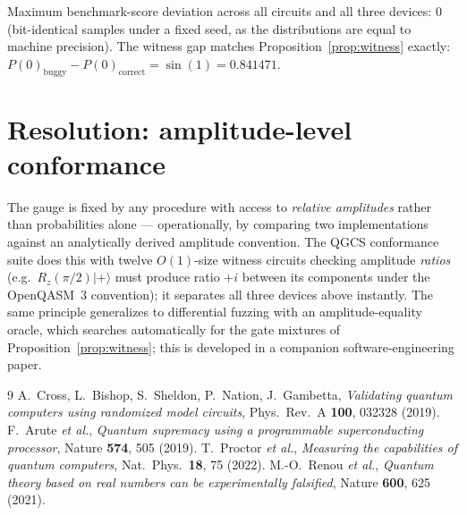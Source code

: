 \documentclass[11pt]{article}
\theoremstyle{definition}
\theoremstyle{remark}
\newcommand{\ket}[1]{\lvert #1 \rangle}
\begin{document}
Maximum benchmark-score deviation across all circuits and all three
devices: $0$ (bit-identical samples under a fixed seed, as the
distributions are equal to machine precision). The witness gap matches
Proposition~\ref{prop:witness} exactly:
$P(0)_{\mathrm{buggy}} - P(0)_{\mathrm{correct}} = \sin(1) = 0.841471$.

\section{Resolution: amplitude-level conformance}\label{sec:resolution}

The gauge is fixed by any procedure with access to \emph{relative
amplitudes} rather than probabilities alone --- operationally, by
comparing two implementations against an analytically derived amplitude
convention. The QGCS conformance suite does this with twelve
$O(1)$-size witness circuits checking amplitude \emph{ratios} (e.g.\
$R_z(\pi/2)\ket{+}$ must produce ratio $+i$ between its components
under the OpenQASM~3 convention); it separates all three devices above
instantly. The same principle generalizes to differential fuzzing with
an amplitude-equality oracle, which searches automatically for the
gate mixtures of Proposition~\ref{prop:witness}; this is developed in a
companion software-engineering paper.

\begin{thebibliography}{9}
 A.~Cross, L.~Bishop, S.~Sheldon, P.~Nation,
J.~Gambetta, \emph{Validating quantum computers using randomized model
circuits}, Phys.\ Rev.\ A \textbf{100}, 032328 (2019).
 F.~Arute \emph{et al.}, \emph{Quantum supremacy
using a programmable superconducting processor}, Nature \textbf{574},
505 (2019).
 T.~Proctor \emph{et al.}, \emph{Measuring the
capabilities of quantum computers}, Nat.\ Phys.\ \textbf{18}, 75 (2022).
\bibitem{renou2021} M.-O.~Renou \emph{et al.}, \emph{Quantum theory
based on real numbers can be experimentally falsified}, Nature
\textbf{600}, 625 (2021).
\end{thebibliography}
\end{document}
